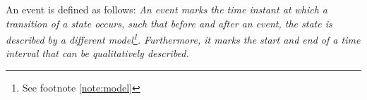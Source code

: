 \documentclass[10pt,final,a4paper,oneside,onecolumn]{article}
\begin{document}
An event is defined as follows: \emph{An event marks the time instant at which a transition of a state occurs, such that before and after an event, the state is described by a different model\footnote{See footnote \ref{note:model}}. Furthermore, it marks the start and end of a time interval that can be qualitatively described.}



\end{document}
